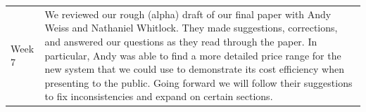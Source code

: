 \documentclass[onecolumn, draftclsnofoot,10pt, compsoc]{IEEEtran}
\begin{document}
\begin{tabular}{l | p{15 cm}}
    Week 7 & We reviewed our rough (alpha) draft of our final paper with Andy Weiss and Nathaniel Whitlock. They made suggestions, corrections, and answered our questions as they read through the paper. In particular, Andy was able to find a more detailed price range for the new system that we could use to demonstrate its cost efficiency when presenting to the public. Going forward we will follow their suggestions to fix inconsistencies and expand on certain sections.  \\
\end{tabular}

\nocite{*}


\end{document}
